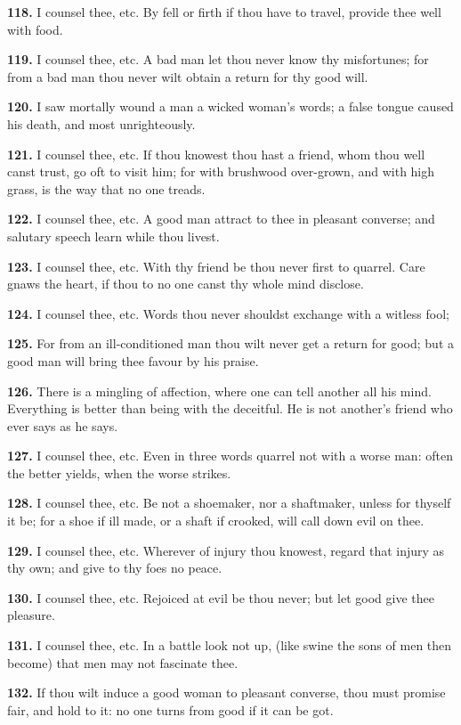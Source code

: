 \textbf{118.} I counsel thee, etc. By fell or firth if thou have to travel,
provide thee well with food.

\textbf{119.} I counsel thee, etc. A bad man let thou never know thy
misfortunes; for from a bad man thou never wilt obtain a return for
thy good will.

\textbf{120.} I saw mortally wound a man a wicked woman's words; a false
tongue caused his death, and most unrighteously.

\textbf{121.} I counsel thee, etc. If thou knowest thou hast a friend, whom
thou well canst trust, go oft to visit him; for with brushwood
over-grown, and with high grass, is the way that no one treads.

\textbf{122.} I counsel thee, etc. A good man attract to thee in pleasant
converse; and salutary speech learn while thou livest.

\textbf{123.} I counsel thee, etc. With thy friend be thou never first to
quarrel. Care gnaws the heart, if thou to no one canst thy whole mind
disclose.

\textbf{124.} I counsel thee, etc. Words thou never shouldst exchange with a
witless fool;

\textbf{125.} For from an ill-conditioned man thou wilt never get a return
for good; but a good man will bring thee favour by his praise.

\textbf{126.} There is a mingling of affection, where one can tell another
all his mind. Everything is better than being with the deceitful. He
is not another's friend who ever says as he says.

\textbf{127.} I counsel thee, etc. Even in three words quarrel not with a
worse man: often the better yields, when the worse strikes.

\textbf{128.} I counsel thee, etc. Be not a shoemaker, nor a shaftmaker,
unless for thyself it be; for a shoe if ill made, or a shaft if
crooked, will call down evil on thee.

\textbf{129.} I counsel thee, etc. Wherever of injury thou knowest, regard
that injury as thy own; and give to thy foes no peace.

\textbf{130.} I counsel thee, etc. Rejoiced at evil be thou never; but let
good give thee pleasure.

\textbf{131.} I counsel thee, etc. In a battle look not up, (like swine the
sons of men then become) that men may not fascinate thee.

\textbf{132.} If thou wilt induce a good woman to pleasant converse, thou
must promise fair, and hold to it: no one turns from good if it can be
got.


